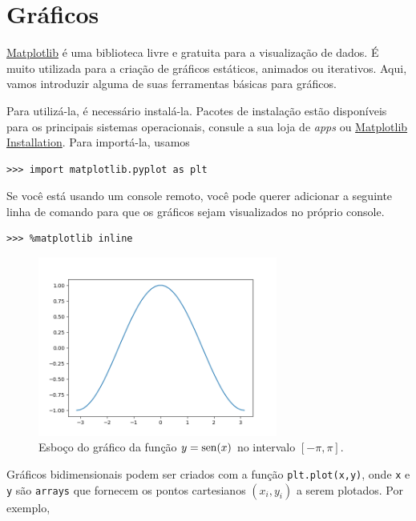 \documentclass[12pt]{article}
\begin{document}
\section{Gráficos}\label{sec_graf}

\href{https://matplotlib.org/}{Matplotlib} é uma biblioteca {\python} livre e gratuita para a visualização de dados. É muito utilizada para a criação de gráficos estáticos, animados ou iterativos. Aqui, vamos introduzir alguma de suas ferramentas básicas para gráficos.

Para utilizá-la, é necessário instalá-la. Pacotes de instalação estão disponíveis para os principais sistemas operacionais, consule a sua loja de {\it apps} ou \href{https://matplotlib.org/stable/users/installing.html}{Matplotlib Installation}. Para importá-la, usamos

\begin{lstlisting}
>>> import matplotlib.pyplot as plt
\end{lstlisting}

\begin{obs}
  Se você está usando um console {\python} remoto, você pode querer adicionar a seguinte linha de comando para que os gráficos sejam visualizados no próprio console.

\begin{lstlisting}
>>> %matplotlib inline
\end{lstlisting}

\end{obs}

\begin{figure}[h]
  \centering
  \includegraphics[width=0.7\textwidth]{./data/sen}
  \caption{Esboço do gráfico da função $y=\operatorname{sen}(x)$ no intervalo $[-\pi,\pi]$.}
  \label{fig:sen}
\end{figure}

Gráficos bidimensionais podem ser criados com a função \lstinline+plt.plot(x,y)+, onde \lstinline+x+ e \lstinline+y+ são \lstinline+arrays+ que fornecem os pontos cartesianos $(x_i, y_i)$ a serem plotados. Por exemplo,
\end{document}
